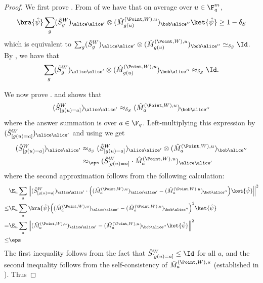 \begin{proof}
We first prove . From  of  we have that on average over $u \in \F_q^m$,
\begin{equation}
\label{eq:qld-constructing-the-paulis-helper0}
	  \bra{\hat{\psi}} \sum_g (\hat{S}^W_g)_{\alice \alice'} \otimes (\hat{M}^{(\Point, W), u}_{g(u)})_{\bob \alice''} \ket{\hat{\psi}} \geq 1 - \delta_S
\end{equation}
which is equivalent to $\sum_g (\hat{S}^W_g)_{\alice \alice'} \otimes (\hat{M}^{(\Point, W), u}_{g(u)})_{\bob \alice''}  \simeq_{\delta_S} \Id$. By , we have that
\[
\sum_g (\hat{S}^W_g)_{\alice \alice'} \otimes (\hat{M}^{(\Point, W), u}_{g(u)})_{\bob \alice''} \approx_{\delta_S} \Id.
\]

We now prove .  and  shows that
\[ (\hat{S}^W_{[g(u)=a]})_{\alice \alice'} \approx_{\delta_S} (\hat{M}^{(\Point, W), u}_{a})_{\bob \alice''}\]
where the answer summation is over $a \in \F_q$. Left-multiplying this expression by $(\hat{S}^W_{[g(u)=a]})_{\alice \alice'}$ and using  we get
\begin{align*}
(\hat{S}^W_{[g(u)=a]})_{\alice \alice'} &\approx_{\delta_S} (\hat{S}^W_{[g(u)=a]})_{\alice \alice'} \otimes (\hat{M}^{(\Point, W), u}_{a})_{\bob \alice''} \\
&\approx_\eps (\hat{S}^W_{[g(u)=a]} \cdot \hat{M}^{(\Point, W), u}_{a})_{\alice \alice'}
\end{align*}
where the second approximation follows from the following calculation:
\begin{align}
	& \E_u \sum_a \left \| (\hat{S}^W_{[g(u)=a]})_{\alice \alice'} \cdot \Big ( (\hat{M}^{(\Point, W), u}_{a})_{\alice \alice'} - (\hat{M}^{(\Point, W), u}_{a})_{\bob \alice''} \Big ) \ket{\hat{\psi}} \right \|^2  \\
	\leq & \E_u \sum_a \bra{\hat{\psi}} \Big ( (\hat{M}^{(\Point, W), u}_{a})_{\alice \alice'} - (\hat{M}^{(\Point, W), u}_{a})_{\bob \alice''} \Big )^2 \ket{\hat{\psi}} \\
	= & \E_u \sum_a \left \| (\hat{M}^{(\Point, W), u}_{a})_{\alice \alice'} - (\hat{M}^{(\Point, W), u}_{a})_{\bob \alice''} \ket{\hat{\psi}} \right \|^2 \\
	\leq & \eps
\end{align}
The first inequality follows from the fact that $\hat{S}^W_{[g(u)=a]} \leq \Id$ for all $a$, and the second inequality follows from the self-consistency of $\hat{M}^{(\Point, W), u}_{a}$ (established in ). Thus

\end{proof}
